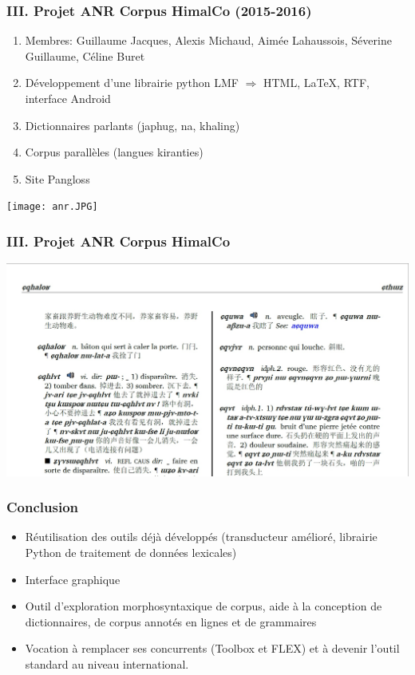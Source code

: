 \documentclass[xcolor=table]{beamer}
\begin{document}
  
 \begin{frame} 
 \frametitle{III. Projet ANR Corpus HimalCo (2015-2016)}
 \begin{enumerate}%
 \item Membres: Guillaume Jacques, Alexis Michaud, Aimée Lahaussois, Séverine 
 Guillaume, Céline Buret
\item Développement d'une librairie python LMF $\Rightarrow$ HTML, \LaTeX, RTF, interface Android
\item Dictionnaires parlants (japhug, na, khaling)
\item Corpus parallèles (langues kiranties)
\item Site Pangloss
 \end{enumerate}
 
  \texttt{[image: anr.JPG]} \centering
  \end{frame}   
  
 \begin{frame} 
 \frametitle{III. Projet ANR Corpus HimalCo}  
   \includegraphics[width=\textwidth]{dico.jpg} \centering
  \end{frame}   
  
 \begin{frame} 
 \frametitle{Conclusion}  
\begin{itemize}
\item Réutilisation des outils déjà développés (transducteur amélioré, librairie Python de traitement de données lexicales)
\item Interface graphique
\item Outil d'exploration morphosyntaxique de corpus, aide à la conception de dictionnaires, de corpus annotés en lignes et de grammaires

\item Vocation à remplacer ses concurrents (Toolbox et FLEX) et à devenir l'outil standard au niveau international.
\end{itemize} 
 
\end{frame}   
\end{document}
